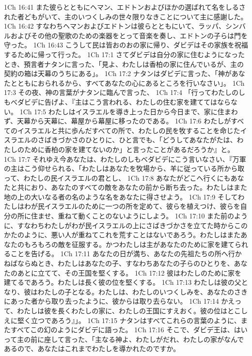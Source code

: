 1Ch 16:41  また彼らとともにヘマン、エドトンおよびほかの選ばれて名をしるされた者どもがいて、主のいつくしみの世々限りなきことについて主に感謝した。
1Ch 16:42  すなわちヘマンおよびエドトンは彼らとともにいて、ラッパ、シンバルおよびその他の聖歌のための楽器をとって音楽を奏し、エドトンの子らは門を守った。
1Ch 16:43  こうして民は皆おのおの家に帰り、ダビデはその家族を祝福するために帰って行った。
1Ch 17:1  さてダビデは自分の家に住むようになったとき、預言者ナタンに言った、「見よ、わたしは香柏の家に住んでいるが、主の契約の箱は天幕のうちにある」。
1Ch 17:2  ナタンはダビデに言った、「神があなたとともにおられるから、すべてあなたの心にあるところを行いなさい」。
1Ch 17:3  その夜、神の言葉がナタンに臨んで言った、
1Ch 17:4  「行ってわたしのしもべダビデに告げよ、『主はこう言われる、わたしの住む家を建ててはならない。
1Ch 17:5  わたしはイスラエルを導き上った日から今日まで、家に住まわず、天幕から天幕に、幕屋から幕屋に移ったのである。
1Ch 17:6  わたしがすべてのイスラエルと共に歩んだすべての所で、わたしの民を牧することを命じたイスラエルのさばきづかさのひとりに、ひと言でも、「どうしてあなたがたは、わたしのために香柏の家を建てないのか」と言ったことがあるだろうか』と。
1Ch 17:7  それゆえ今あなたは、わたしのしもべダビデにこう言いなさい、『万軍の主はこう仰せられる、「わたしはあなたを牧場から、羊に従っている所から取って、わたしの民イスラエルの君とし、
1Ch 17:8  あなたがどこへ行くにもあなたと共におり、あなたのすべての敵をあなたの前から断ち去った。わたしはまた地の上の大いなる者の名のような名をあなたに得させよう。
1Ch 17:9  そしてわたしはわが民イスラエルのために一つの所を定めて、彼らを植えつけ、彼らを自分の所に住ませ、重ねて動くことのないようにしよう。
1Ch 17:10  また前のように、すなわちわたしがわが民イスラエルの上にさばきづかさを立てた時からこのかたのように、悪い人が重ねてこれを荒すことはないであろう。わたしはまたあなたのもろもろの敵を征服する。かつわたしは主があなたのために家を建てられることを告げる。
1Ch 17:11  あなたの日が満ち、あなたの先祖たちの所へ行かねばならぬとき、わたしはあなたの子、すなわちあなたの子らのひとりを、あなたのあとに立てて、その王国を堅くする。
1Ch 17:12  彼はわたしのために家を建てるであろう。わたしは長く彼の位を堅くする。
1Ch 17:13  わたしは彼の父となり、彼はわたしの子となる。わたしは、わたしのいつくしみを、あなたのさきにあった者から取り去ったように、彼からは取り去らない。
1Ch 17:14  かえって、わたしは彼を長くわたしの家に、わたしの王国にすえおく。彼の位はとこしえに堅く立つであろう』」。
1Ch 17:15  ナタンはすべてこれらの言葉のように、またすべてこの幻のようにダビデに語った。
1Ch 17:16  そこで、ダビデ王は、はいって主の前に座して言った、「主なる神よ、わたしがだれ、わたしの家がなんであるので、あなたはこれまでわたしを導かれたのですか。
